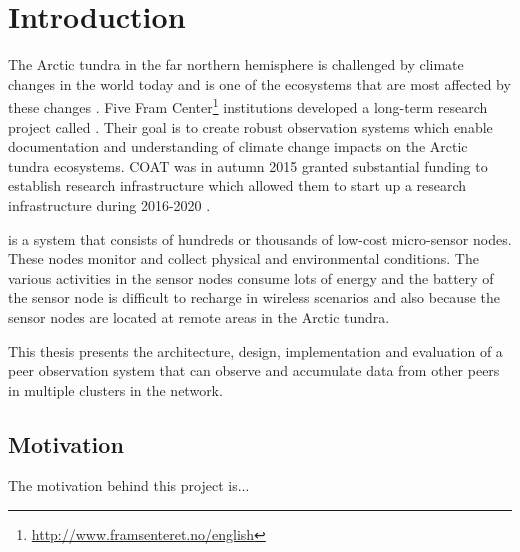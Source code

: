 \documentclass[USenglish]{uit-thesis}
\begin{document}
\tableofcontents


\listoflistings

\printacronyms


\mainmatter

\chapter{Introduction}
The Arctic tundra in the far northern hemisphere is challenged by climate changes in the world today and is one of the ecosystems that are most affected by these changes \cite{coat2016}. Five Fram Center\footnote{\url{http://www.framsenteret.no/english}} institutions developed a long-term research project called . Their goal is to create robust observation systems which enable documentation and understanding of climate change impacts on the Arctic tundra ecosystems. COAT was in autumn 2015 granted substantial funding to establish research infrastructure which allowed them to start up a research infrastructure during 2016-2020 \cite{coat2016}.

 is a system that consists of hundreds or thousands of low-cost micro-sensor nodes. These nodes monitor and collect physical and environmental conditions. The various activities  in the sensor nodes consume lots of energy and the battery of the sensor node is difficult to recharge in wireless scenarios and also because the sensor nodes are located at remote areas in the Arctic tundra.



This thesis presents the architecture, design, implementation and evaluation of a peer observation system that can observe and accumulate data from other peers in multiple clusters in the network.

\section{Motivation}
The motivation behind this project is...


\end{document}

